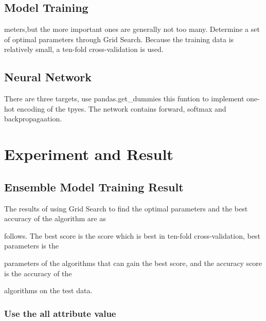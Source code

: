 \subsection{Model Training}
meters,but the more important ones are generally not too many. Determine a set of optimal parameters through Grid Search. Because the training data is relatively small, a ten-fold cross-validation is used. %

\subsection{Neural Network}
There are three targets, 
use pandas.get_dummies this funtion to implement one-hot encoding of the tpyes.
The network contains forward, 
softmax and backpropagaation.


\section{Experiment and Result}

\subsection{Ensemble Model Training Result}

The results of using Grid Search to find the optimal parameters and the best accuracy of the algorithm are as 
 
follows. The best score is the score which is best in ten-fold cross-validation, best parameters is the 

parameters of the algorithms that can gain the best score, and the accuracy score is the accuracy of the 

algorithms on the test data. 

\subsubsection[Train_Data_1]{Use the all attribute value}

